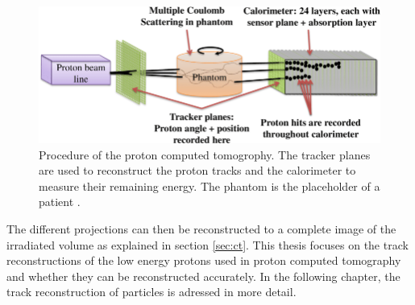 \begin{figure}
  \centering
  \includegraphics[height=0.4\textwidth]{images/proton_ct.png}
  \caption{Procedure of the proton computed tomogrophy. The tracker planes are used to reconstruct the proton tracks and the calorimeter to measure their remaining energy.
  The phantom is the placeholder of a patient \cite{proton_ct}.}
  \label{fig:proton_ct}
\end{figure}

The different projections can then be reconstructed to a complete image of the irradiated volume as explained in section \ref{sec:ct}.
This thesis focuses on the track reconstructions of the low energy protons used in proton computed tomography and whether they can be reconstructed accurately.
In the following chapter, the track reconstruction of particles is adressed in more detail.
